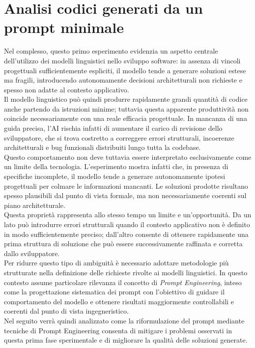 \section{Analisi codici generati da un prompt minimale}
Nel complesso, questo primo esperimento evidenzia un aspetto centrale dell’utilizzo dei modelli linguistici nello sviluppo software: in assenza di vincoli progettuali sufficientemente espliciti, il modello tende a generare soluzioni estese ma fragili, introducendo autonomamente decisioni architetturali non richieste e spesso non adatte al contesto applicativo.
\\
Il modello linguistico può quindi produrre rapidamente grandi quantità di codice anche partendo da istruzioni minime; tuttavia questa apparente produttività non coincide necessariamente con una reale efficacia progettuale. In mancanza di una guida precisa, l’AI rischia infatti di aumentare il carico di revisione dello sviluppatore, che si trova costretto a correggere errori strutturali, incoerenze architetturali e bug funzionali distribuiti lungo tutta la codebase.
\\
Questo comportamento non deve tuttavia essere interpretato esclusivamente come un limite della tecnologia. L'esperimento mostra infatti che, in presenza di specifiche incomplete, il modello tende a generare autonomamente ipotesi progettuali per colmare le informazioni mancanti. Le soluzioni prodotte risultano spesso plausibili dal punto di vista formale, ma non necessariamente coerenti sul piano architetturale.
\\
Questa proprietà rappresenta allo stesso tempo un limite e un'opportunità. Da un lato può introdurre errori strutturali quando il contesto applicativo non è definito in modo sufficientemente preciso; dall'altro consente di ottenere rapidamente una prima struttura di soluzione che può essere successivamente raffinata e corretta dallo sviluppatore.
\\
Per ridurre questo tipo di ambiguità è necessario adottare metodologie più strutturate nella definizione delle richieste rivolte ai modelli linguistici. In questo contesto assume particolare rilevanza il concetto di \textit{Prompt Engineering}, inteso come la progettazione sistematica dei prompt con l'obiettivo di guidare il comportamento del modello e ottenere risultati maggiormente controllabili e coerenti dal punto di vista ingegneristico.
\\
Nel seguito verrà quindi analizzato come la riformulazione del prompt mediante tecniche di Prompt Engineering consenta di mitigare i problemi osservati in questa prima fase sperimentale e di migliorare la qualità delle soluzioni generate.

